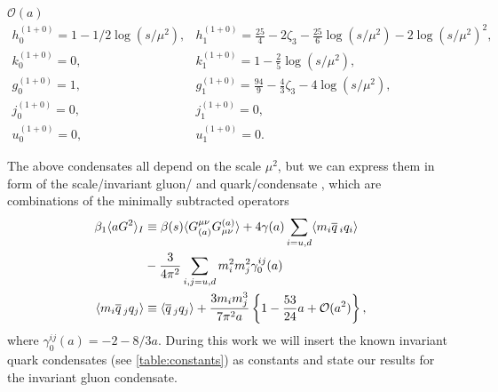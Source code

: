 \documentclass[../../index.tex]{subfiles}
\begin{document}
\(\mathcal{O}(a)\)
\begin{equation}
  \begin{array}{ll}
    h_0^{(1+0)}=1-1/2 \log(s/\mu^2), & h_1^{(1+0)}=\frac{25}{4}-2\zeta_3-\frac{25}{6}\log(s/\mu^2)-2 \log(s/\mu^2)^2, \\
    k_0^{(1+0)}=0, & k_1^{(1+0)}=1-\frac{2}{5}\log(s/\mu^2), \\
    g_0^{(1+0)}=1, & g_1^{(1+0)}=\frac{94}{9}-\frac{4}{3}\zeta_3-4 \log(s/\mu^2), \\
    j_0^{(1+0)}=0, & j_1^{(1+0)}=0, \\
    u_0^{(1+0)}=0, & u_1^{(1+0)}=0.
  \end{array}
\end{equation}

The above condensates all depend on the scale \(\mu^2\), but we can express them
in form of the scale\-/invariant gluon\-/ and quark\-/condensate
\cite{Spiridonov1988}, which are combinations of the minimally subtracted
operators
\begin{align}
  \beta_1 \langle a G^2 \rangle_I
  &\equiv \beta(s) \langle
    G_{(a)}^{\mu\nu}G_{\mu\nu}^{(a)} \rangle + 4 \gamma(a) \sum_{i=u,d} \langle
    m_i \overline{q}\,_i q_i \rangle \nonumber \\ 
  &- \frac{3}{4\pi^2} \sum_{i,j=u,d} m_i^2m_j^2
    \gamma_0^{ij}(a) \\
  \langle  m_i \overline{q}\,_j q_j \rangle
  &\equiv \langle \overline{q}\,_j q_j \rangle
    +\frac{3 m_i m_j^3}{7 \pi^2 a} \left\{ 1 - \frac{53}{24}a + \mathcal{O}(a^2) \right\},
\end{align}
where \(\gamma_0^{ij}(a) = -2 - 8/3 a\). During this work we will insert the
known invariant quark condensates (see \cref{table:constants}) as constants and
state our results for the invariant gluon condensate.
\end{document}

